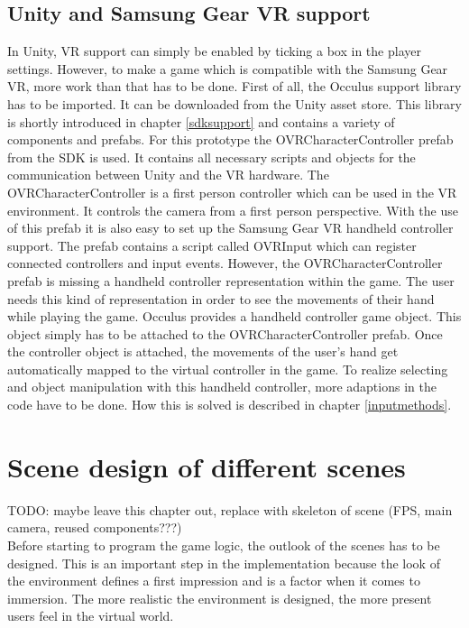 \subsection{Unity and Samsung Gear VR support} \label{gearvrsupport}
In Unity, VR support can simply be enabled by ticking a box in the player settings. However, to make a game which is compatible with the Samsung Gear VR, more work than that has to be done. First of all, the Occulus support library has to be imported. It can be downloaded from the Unity asset store. This library is shortly introduced in chapter \ref{sdksupport} and contains a variety of components and prefabs. For this prototype the OVRCharacterController prefab from the SDK is used. It contains all necessary scripts and objects for the communication between Unity and the VR hardware. The OVRCharacterController is a first person controller which can be used in the VR environment. It controls the camera from a first person perspective. With the use of this prefab it is also easy to set up the Samsung Gear VR handheld controller support. The prefab contains a script called OVRInput which can register connected controllers and input events. However, the OVRCharacterController prefab is missing a handheld controller representation within the game. The user needs this kind of representation in order to see the movements of their hand while playing the game. Occulus provides a handheld controller game object. This object simply has to be attached to the OVRCharacterController prefab. Once the controller object is attached, the movements of the user's hand get automatically mapped to the virtual controller in the game. To realize selecting and object manipulation with this handheld controller, more adaptions in the code have to be done. How this is solved is described in chapter \ref{inputmethods}.

\section{Scene design of different scenes}
TODO: maybe leave this chapter out, replace with skeleton of scene (FPS, main camera, reused components???)\\
Before starting to program the game logic, the outlook of the scenes has to be designed. This is an important step in the implementation because the look of the environment defines a first impression and is a factor when it comes to immersion. The more realistic the environment is designed, the more present users feel in the virtual world.
